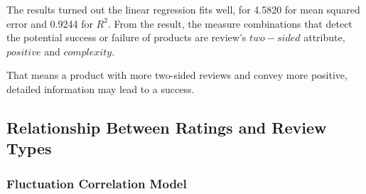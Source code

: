 \documentclass{mcmthesis}
\begin{document}
\quad The results turned out the linear regression fits well, for 4.5820 for mean squared error and 0.9244 for $R^2$. From the result, the measure combinations that detect the potential success or failure of products are review's $two-sided$ attribute, $positive$ and $complexity$. 

\quad That means a product with more two-sided reviews and convey more positive, detailed information may lead to a success.

\subsection{Relationship Between Ratings and Review Types}

\subsubsection{Fluctuation Correlation Model}
\end{document}
